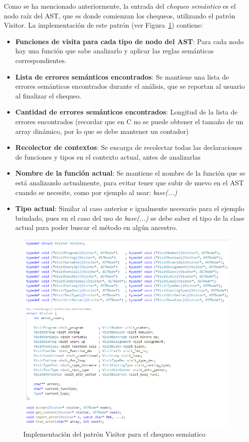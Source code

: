 \documentclass{llncs}
\begin{document}
Como se ha mencionado anteriormente, la entrada del \textit{chequeo semántico} es el nodo raíz del AST, que es donde comienzan los chequeos, utilizando el
patrón Visitor. La implementación de este patrón (ver Figura~\ref{fig:visitor}) contiene: 
\begin{itemize}
    \item \textbf{Funciones de visita para cada tipo de nodo del AST}: Para cada nodo hay una función que sabe analizarlo y aplicar las reglas semánticas correspondientes.
    \item \textbf{Lista de errores semánticos encontrados}: Se mantiene una lista de errores semánticos encontrados durante el análisis, que se reportan al usuario al finalizar el chequeo.
    \item \textbf{Cantidad de errores semánticos encontrados}: Longitud de la lista de errores encontrados (recordar que en C no se puede obtener el tamaño de un array dinámico, por lo que se debe mantener un contador)
    \item \textbf{Recolector de contextos}: Se encarga de recolectar todas las declaraciones de funciones y tipos en el contexto actual, antes de analizarlas
    \item \textbf{Nombre de la función actual}: Se mantiene el nombre de la función que se está analizando actualmente, para evitar tener que subir de nuevo en el AST cuando se necesite, como por ejemplo al usar: \textit{base(...)}
    \item \textbf{Tipo actual}: Similar al caso anterior e igualmente necesario para el ejemplo brindado, pues en el caso del uso de \textit{base(...)} se debe saber el tipo de la clase actual para poder buscar el método en algún ancestro.
\end{itemize}

\begin{figure}[h]
\centering
\includegraphics[width=1\textwidth]{images/visitor.png}
\caption{Implementación del patrón Visitor para el chequeo semántico}
\label{fig:visitor}
\end{figure}
\end{document}
